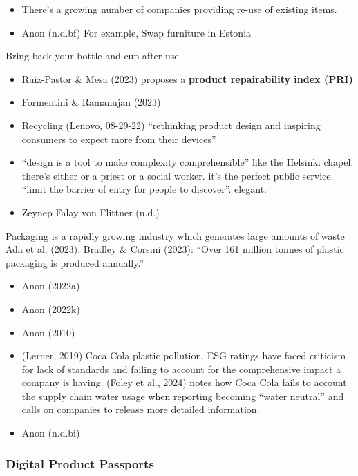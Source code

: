 \documentclass[
  letterpaper,
  DIV=11,
  numbers=noendperiod]{scrartcl}
\providecommand{\tightlist}{%
  \setlength{\itemsep}{0pt}\setlength{\parskip}{0pt}}\usepackage{longtable,booktabs,array}
\begin{document}
\begin{itemize}
\tightlist
\item
  There's a growing number of companies providing re-use of existing
  items.
\item
  Anon (n.d.bf) For example, Swap furniture in Estonia
\end{itemize}

Bring back your bottle and cup after use.

\begin{itemize}
\tightlist
\item
  Ruiz-Pastor \& Mesa (2023) proposes a \textbf{product repairability
  index (PRI)}
\item
  Formentini \& Ramanujan (2023)
\item
  Recycling (Lenovo, 08-29-22) ``rethinking product design and inspiring
  consumers to expect more from their devices''
\item
  ``design is a tool to make complexity comprehensible'' like the
  Helsinki chapel. there's either or a priest or a social worker. it's
  the perfect public service. ``limit the barrier of entry for people to
  discover''. elegant.
\item
  Zeynep Falay von Flittner (n.d.)
\end{itemize}

Packaging is a rapidly growing industry which generates large amounts of
waste Ada et al. (2023). Bradley \& Corsini (2023): ``Over 161 million
tonnes of plastic packaging is produced annually.''

\begin{itemize}
\tightlist
\item
  Anon (2022a)
\item
  Anon (2022k)
\item
  Anon (2010)
\item
  (Lerner, 2019) Coca Cola plastic pollution. ESG ratings have faced
  criticism for lack of standards and failing to account for the
  comprehensive impact a company is having. (Foley et al., 2024) notes
  how Coca Cola fails to account the supply chain water usage when
  reporting becoming ``water neutral'' and calls on companies to release
  more detailed information.
\item
  Anon (n.d.bi)
\end{itemize}

\subsubsection{Digital Product
Passports}\label{digital-product-passports}
\end{document}
